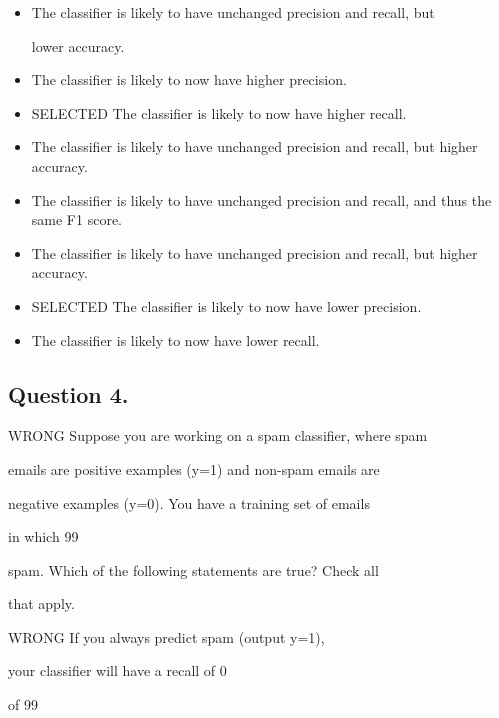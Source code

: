 \documentclass[11pt]{article} %
\begin{document}
\begin{itemize}
	\item The classifier is likely to have unchanged precision and recall, but
	
	lower accuracy.
	
\item 	The classifier is likely to now have higher precision.
	
\item 	SELECTED The classifier is likely to now have higher recall.
	
\item	The classifier is likely to have unchanged precision and recall, but higher accuracy.
	
	
\item 	The classifier is likely to have unchanged precision and recall, and thus the same F1 score.
	
\item 	The classifier is likely to have unchanged precision and recall, but	higher accuracy.
	
	
\item 	SELECTED The classifier is likely to now have lower precision.
	
\item	The classifier is likely to now have lower recall.
\end{itemize}

\subsection*{Question 4.} WRONG
Suppose you are working on a spam classifier, where spam

emails are positive examples (y=1) and non-spam emails are

negative examples (y=0). You have a training set of emails

in which 99%

spam. Which of the following statements are true? Check all

that apply.


WRONG If you always predict spam (output y=1),

your classifier will have a recall of 0%

of 99%
\end{document}
